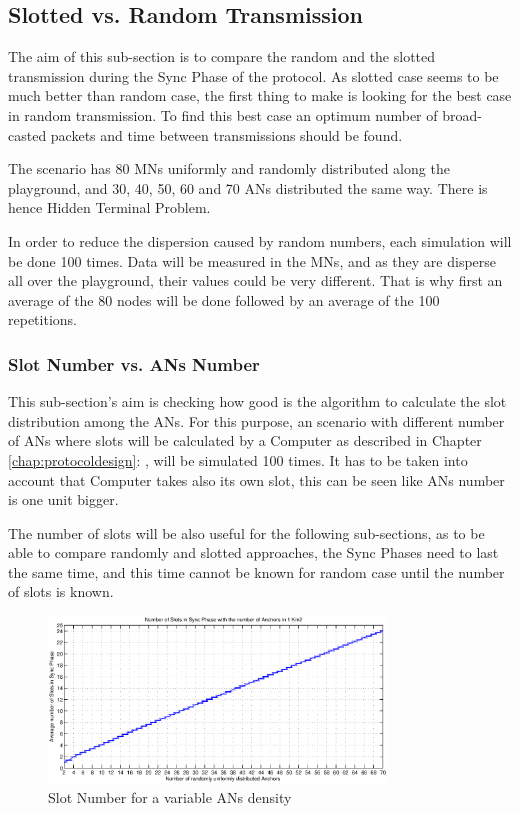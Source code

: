 \subsection{Slotted vs. Random Transmission}

The aim of this sub-section is to compare the random and the slotted transmission during the Sync Phase of the protocol. As slotted case seems to be
much better than random case, the first thing to make is looking for the best case in random transmission. To find this best case an optimum number
of broad-casted packets and time between transmissions should be found.

The scenario has 80 \acp{MN} uniformly and randomly distributed along the playground, and 30, 40, 50, 60 and 70 \acp{AN} distributed the same way.
There is hence Hidden Terminal Problem.

In order to reduce the dispersion caused by random numbers, each simulation will be done 100 times. Data will be measured in the \acp{MN}, and as 
they are disperse all over the playground, their values could be very different. That is why first an average of the 80 nodes will be done followed 
by an average of the 100 repetitions.

\subsubsection{Slot Number vs. \acp{AN} Number}

This sub-section's aim is checking how good is the algorithm to calculate the slot distribution among the \acp{AN}. For this purpose, an scenario 
with different number of \acp{AN} where slots will be calculated by a Computer as described in Chapter \ref{chap:protocoldesign}: 
, will be simulated 100 times. It has to be taken into account that Computer takes also its own slot, this can be seen
like \acp{AN} number is one unit bigger.

The number of slots will be also useful for the following sub-sections, as to be able to compare randomly and slotted approaches, the Sync Phases need 
to last the same time, and this time cannot be known for random case until the number of slots is known.

\begin{figure}[ht]
 \begin{center}
  \includegraphics[width=0.8\textwidth]{numberOfSlotsWithTheAnchorDensity.eps}
 \end{center}
 \caption{Slot Number for a variable \acp{AN} density}
 \label{fig:numberOfSlotsWithTheAnchorDensity}
\end{figure}

